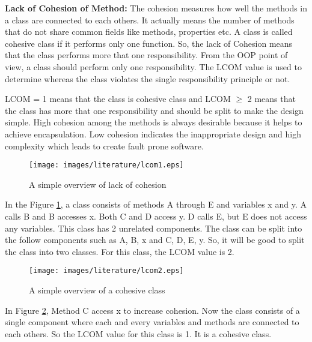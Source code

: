 \documentclass[12pt]{report}
\begin{document}
\textbf{Lack of Cohesion of Method:} 
The cohesion measures how well the methods in a class are connected to each others. It actually means the number of methods that do not share common fields like methods, properties etc. A class is called cohesive class if it performs only one function. So, the lack of Cohesion means that the class performs more that one responsibility. From the OOP point of view, a class should perform only one responsibility. The LCOM value is used to determine whereas the class violates the single responsibility principle or not. 

LCOM = 1 means that the class is cohesive class and LCOM $\geq$ 2 means that the class has more that one responsibility and should be split to make the design simple. High cohesion among the methods is always desirable because it helps to achieve encapsulation. Low cohesion indicates the inappropriate design and high complexity which leads to create fault prone software.   

\begin{figure}[h!]
  \centering
    \texttt{[image: images/literature/lcom1.eps]}
		\caption{A simple overview of lack of cohesion}
		\label{lcom1}
\end{figure}


In the Figure \ref{lcom1}, a class consists of methods A through E and variables x and y. A calls B and B accesses x. Both C and D access y. D calls E, but E does not access any variables. This class has 2 unrelated components. The class can be split into the follow components such as {A, B, x} and {C, D, E, y}. So, it will be good to split the class into two classes. For this class, the LCOM value is 2. 
\begin{figure}[h!]
  \centering
    \texttt{[image: images/literature/lcom2.eps]}
		\caption{A simple overview of a cohesive class}
		\label{lcom2}
\end{figure}

In Figure \ref{lcom2}, Method C access x to increase cohesion. Now the class consists of a single component where each and every variables and methods are connected to each others. So the LCOM value for this class is 1. It is a cohesive class. 
\end{document}

